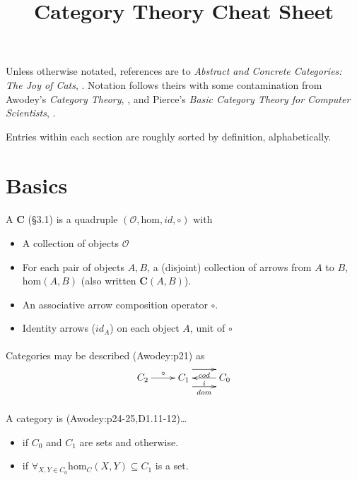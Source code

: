 \documentclass[10pt,twocolumn,letterpaper]{article}
\title{Category Theory Cheat Sheet}
\begin{document}
Unless otherwise notated, references are to \textit{Abstract and Concrete
Categories: The Joy of Cats}, \cite{adamek:joy}.  Notation follows theirs
with some contamination from Awodey's \textit{Category Theory},
\cite{awodey:ct}, and Pierce's \textit{Basic Category Theory for Computer
Scientists}, \cite{pierce:basicct}.

Entries within each section are roughly sorted by definition, alphabetically.

\section{Basics} %

  \paragraph{}
  A  $\mathbf{C}$ (\S3.1) is a quadruple
  $(\mathcal{O},\mbox{hom},id,\circ)$ with
  \begin{itemize}
    \item A collection of objects $\mathcal{O}$
  \item For each pair of objects $A,B$, a (disjoint) collection of arrows
    from  $A$ to  $B$,
    $\mbox{hom}(A,B)$ (also written $\mathbf{C}(A,B)$).
    \item An associative arrow composition operator $\circ$.
    \item Identity arrows ($id_A$) on each object $A$, unit of $\circ$
  \end{itemize}

  \paragraph{}
  Categories may be described (Awodey:p21) as
     \[\xymatrix{ C_2 \ar[r]^\circ & C_1 \ar@<2ex>[r]_{cod} \ar@<-2ex>[r]_{dom} & C_0 \ar[l]^i }\]

  \paragraph{}
  A category is (Awodey:p24-25,D1.11-12)\dots
    \begin{itemize}
      \item {} if $C_0$ and $C_1$ are sets and  otherwise.
      \item {} if $\forall_{X,Y \in C_0} \mbox{hom}_C(X,Y) \subseteq C_1$ is a set.
    \end{itemize}
\end{document}
